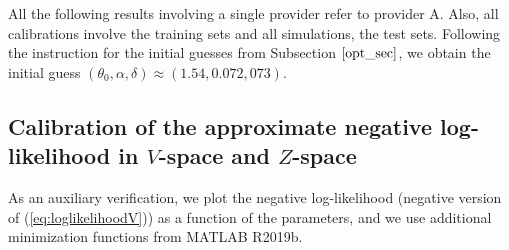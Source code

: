 \documentclass[11pt]{article}
\theoremstyle{definition}
\begin{document}
All the following results involving a single provider refer to provider A. Also, all calibrations involve the training sets and all simulations, the test sets. Following the instruction for the initial guesses from Subsection $\ref{opt_sec}$, we obtain the initial guess $(\theta_0,\alpha,\delta)\approx(1.54,0.072,073)$.

\subsection{Calibration of the approximate negative log-likelihood in $V$-space and $Z$-space}

As an auxiliary verification, we plot the negative log-likelihood (negative version of (\ref{eq:loglikelihoodV})) as a function of the parameters, and we use additional minimization functions from MATLAB R2019b.
\end{document}
